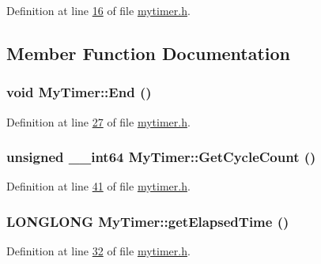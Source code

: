 Definition at line \hyperlink{mytimer_8h_source_l00016}{16} of file \hyperlink{mytimer_8h_source}{mytimer.h}.



\subsection{Member Function Documentation}
\hypertarget{class_my_timer_a9c499fe726dbd8a30c528727f42e993d}{
\subsubsection[{End}]{\setlength{\rightskip}{0pt plus 5cm}void MyTimer::End ()}}
\label{class_my_timer_a9c499fe726dbd8a30c528727f42e993d}


Definition at line \hyperlink{mytimer_8h_source_l00027}{27} of file \hyperlink{mytimer_8h_source}{mytimer.h}.

\hypertarget{class_my_timer_ae695b0dd5d9c28c1d3dc46ba4c616eec}{
\subsubsection[{GetCycleCount}]{\setlength{\rightskip}{0pt plus 5cm}unsigned \_\-\_\-int64 MyTimer::GetCycleCount ()}}
\label{class_my_timer_ae695b0dd5d9c28c1d3dc46ba4c616eec}


Definition at line \hyperlink{mytimer_8h_source_l00041}{41} of file \hyperlink{mytimer_8h_source}{mytimer.h}.

\hypertarget{class_my_timer_abd0f6728cf64f7b5d81235588bb8e3c2}{
\subsubsection[{getElapsedTime}]{\setlength{\rightskip}{0pt plus 5cm}LONGLONG MyTimer::getElapsedTime ()}}
\label{class_my_timer_abd0f6728cf64f7b5d81235588bb8e3c2}


Definition at line \hyperlink{mytimer_8h_source_l00032}{32} of file \hyperlink{mytimer_8h_source}{mytimer.h}.



